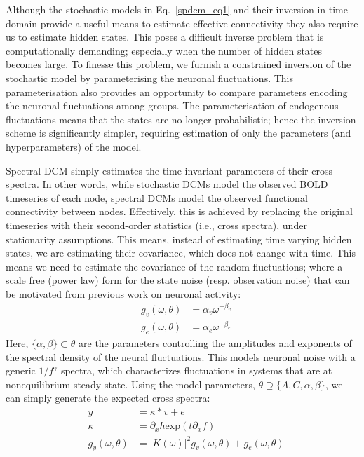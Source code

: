 Although the stochastic models in  Eq.~\ref{spdcm_eq1} and their inversion in time domain provide a useful means to estimate effective connectivity they also require us to estimate hidden states. This poses a difficult inverse problem that is computationally demanding; especially when the number of hidden states becomes large. To finesse this problem, we furnish a constrained inversion of the stochastic model by parameterising the neuronal fluctuations. This parameterisation also provides an opportunity to compare parameters encoding the neuronal fluctuations among groups. The parameterisation of endogenous fluctuations means that the states are no longer probabilistic; hence the inversion scheme is significantly simpler, requiring estimation of only the parameters (and hyperparameters) of the model.

Spectral DCM simply estimates the time-invariant parameters of their cross spectra. In other words, while stochastic DCMs model the observed BOLD timeseries of each node, spectral DCMs model the observed functional connectivity between nodes. Effectively, this is achieved by replacing the original timeseries with their second-order statistics (i.e., cross spectra), under stationarity assumptions. This means, instead of estimating time varying hidden states, we are estimating their covariance, which does not change with time. This means we need to estimate the covariance of the random fluctuations; where a scale free (power law) form for the state noise (resp. observation noise) that can be motivated from previous work on neuronal activity:
\begin{eqnarray}\label{spdcm_eq4}
& g_{v}(\omega,\theta) & = \alpha_{v}\omega^{-\beta_{v}}\\ \nonumber
& g_{e}(\omega,\theta) & = \alpha_{e}\omega^{-\beta_{e}}
\end{eqnarray}
Here, $\{\alpha,\beta\}\subset \theta$ are the parameters controlling the amplitudes and exponents of the spectral density of the neural fluctuations. This models neuronal noise with a generic $1/f^{\gamma}$ spectra, which characterizes fluctuations in systems that are at nonequilibrium steady-state. Using the model parameters, $\theta \supseteq \{A,C,\alpha, \beta\}$, we can simply generate the expected cross spectra:
\begin{eqnarray}\label{spdcm_eq5}
& y & = \kappa \ast v + e\\ \nonumber
& \kappa & = \partial_x h \mathrm{exp} (t \partial_x f ) \\ \nonumber
& g_{y}(\omega,\theta) & = |K(\omega)|^2 g_{v}(\omega,\theta) + g_{e}(\omega,\theta)
\end{eqnarray}
